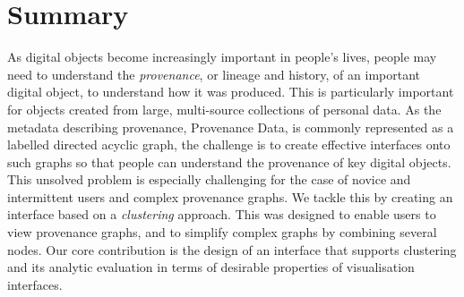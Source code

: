 \chapter{Summary}
As digital objects become increasingly important in people's lives, people may need to understand the 
\emph{provenance}, or lineage and history, of an important digital object,
to understand how  it was produced.
This is particularly important for objects created from large, multi-source collections of personal data.
As the metadata  describing provenance, Provenance Data, is commonly represented as a labelled directed acyclic graph,
the challenge is to create effective interfaces onto such graphs
so that people can understand the provenance of key digital objects.
This unsolved problem is especially challenging for the case of novice and intermittent users and
complex provenance graphs.
We tackle this by creating an interface based on a \emph{clustering} approach.
This was designed to enable users to view provenance graphs,
and to simplify complex graphs by combining several nodes.
Our core contribution is the design of an interface that supports clustering
and its analytic evaluation in terms of desirable properties of visualisation interfaces.
